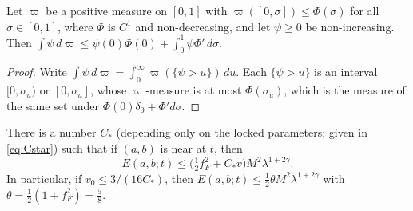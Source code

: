 \begin{lemma}\label{lem:layercake}
Let $\varpi$ be a positive measure on $[0,1]$ with $\varpi([0,\sigma])\le\Phi(\sigma)$ for all $\sigma\in[0,1]$, where
$\Phi$ is $C^1$ and non-decreasing, and let $\psi\ge0$ be non-increasing. Then
$\int\psi\,d\varpi\le\psi(0)\Phi(0)+\int_0^1\psi\Phi'\,d\sigma$.
\end{lemma}

\begin{proof}
Write $\int\psi\,d\varpi=\int_0^\infty\varpi(\{\psi>u\})\,du$. Each $\{\psi>u\}$ is an interval $[0,\sigma_u)$ or
$[0,\sigma_u]$, whose $\varpi$-measure is at most $\Phi(\sigma_u)$, which is the measure of the same set under
$\Phi(0)\delta_0+\Phi'd\sigma$.
\end{proof}

\begin{proposition}\label{prop:near}
There is a number $C_*$ (depending only on the locked parameters; given in \eqref{eq:Cstar}) such that if $(a,b)$ is
near at $t$, then
\[
E(a,b;t)\le\bigl(\tfrac12f_F^2+C_*v\bigr)M^2\lambda^{1+2\gamma}.
\]
In particular, if $v_0\le3/(16C_*)$, then $E(a,b;t)\le\frac12\bar\theta M^2\lambda^{1+2\gamma}$ with
$\bar\theta=\frac12(1+f_F^2)=\frac58$.
\end{proposition}

